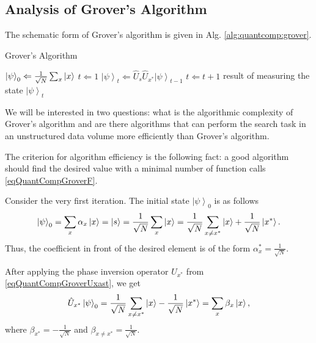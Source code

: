 \subsection{Analysis of Grover's Algorithm}

The schematic form of Grover's algorithm is given in Alg.
\ref{alg:quantcomp:grover}.  
\begin{algorithm}
\caption{Grover's Algorithm}
\label{alg:quantcomp:grover}
\begin{algorithmic}
    \STATE $\left|\psi\right>_0 \Leftarrow \frac{1}{\sqrt{N}}\sum_x 
    \ket{x}$
    \STATE $t \Leftarrow 1$
    \REPEAT
    \STATE $\left|\psi\right>_t \Leftarrow \hat{U}_s\hat{U}_{x^{\ast}}
    \left|\psi\right>_{t-1}$
    \STATE $t \Leftarrow t + 1$
    \RETURN result of measuring the state $\left|\psi\right>_t$
\end{algorithmic}
\end{algorithm}

We will be interested in two questions: what is the algorithmic complexity
of Grover's algorithm and are there algorithms that can perform
the search task in an unstructured data volume more efficiently than
Grover's algorithm.

The criterion for algorithm efficiency is the following fact: a good
algorithm should find the desired value with a minimal number of
function calls \eqref{eqQuantCompGroverF}.

Consider the very first iteration. The initial state
$\left|\psi\right>_0$ is as follows
\begin{equation}
\left|\psi\right>_0 =
\sum_x \alpha_x \ket{x} =  
\ket{s} = 
\frac{1}{\sqrt{N}}\sum_x \ket{x} = 
\frac{1}{\sqrt{N}}\sum_{x\ne x^{\ast}} \ket{x} +
\frac{1}{\sqrt{N}} \left|x^{\ast}\right>.
\nonumber
\end{equation}
Thus, the coefficient in front of the desired element is of the form
$\alpha_x^{\ast} = \frac{1}{\sqrt{N}}$. 

After applying the phase inversion operator
$U_{x^{\ast}}$ from \eqref{eqQuantCompGroverUxast}, we get
\begin{equation}
\hat{U}_{x^{\ast}} \left|\psi\right>_0 =
\frac{1}{\sqrt{N}}\sum_{x\ne x^{\ast}} \ket{x} - 
\frac{1}{\sqrt{N}} \left|x^{\ast}\right> = \sum_x \beta_x \ket{x},
\nonumber
\end{equation}
where $\beta_{x^\ast} = - \frac{1}{\sqrt{N}}$ and $\beta_{x \ne x^\ast} =
\frac{1}{\sqrt{N}}$. 

